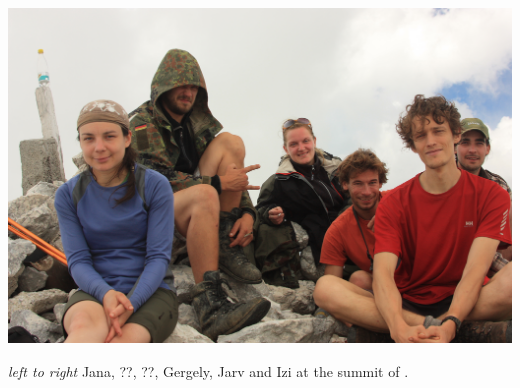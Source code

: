 \begin{pagefigure}
\checkoddpage \ifoddpage \forcerectofloat \else \forceversofloat \fi
   \centering
\includegraphics[width = \textwidth]{2011/stuck_in_paradise/2011-08-02-12.35.07-Gergely Ambrus-Canon450D-IMG_0854-Walk up Kuk--orig.jpg}
\caption{\textit{left to right} Jana, ??, ??, Gergely, Jarv and Izi at the summit of . } \label{kuk crew}
\end{pagefigure}
